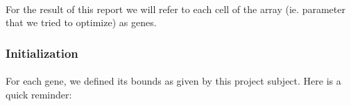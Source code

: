 \documentclass{article}
\begin{document}
      
      \paragraph{} %
      \label{par:}
        For the result of this report we will refer to each cell of the array
        (ie. parameter that we tried to optimize) as genes.
    
    \subsubsection{Initialization} %
    \label{ssub:initialization}
      
      \paragraph{} %
      \label{par:}
        For each gene, we defined its bounds as given by this project subject.
        Here is a quick reminder:
      
\end{document}
